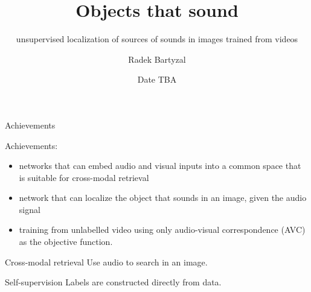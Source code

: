 \documentclass{beamer}
\begin{document}
\title{Objects that sound }  
\subtitle{unsupervised localization of sources of sounds in images trained from videos}
\author{Radek Bartyzal}
\date{Date TBA} 

\frame{\titlepage} 

\begin{frame}{Achievements}

Achievements:

\begin{itemize}

\item networks that can embed audio and visual inputs into a common space that is suitable for cross-modal retrieval
\medskip
\item network that can localize the object that sounds in an image, given the audio signal
\medskip
\item training from unlabelled video using only audio-visual correspondence (AVC) as the objective function. 
\end{itemize}
\medskip

\begin{block}{Cross-modal retrieval}
Use audio to search in an image.
\end{block}

\begin{block}{Self-supervision}
Labels are constructed directly from data.
\end{block}

\end{frame}
\end{document}
